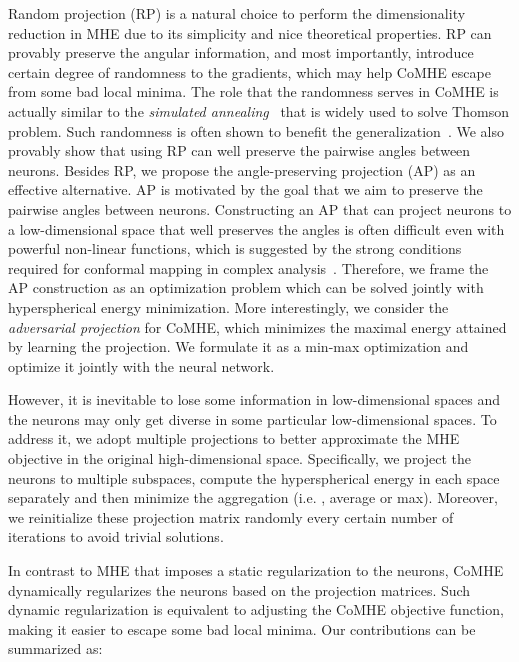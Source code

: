 \par
Random projection (RP) is a natural choice to perform the dimensionality reduction in MHE due to its simplicity and nice theoretical properties. RP can provably preserve the angular information, and most importantly, introduce certain degree of randomness to the gradients, which may help CoMHE escape from some bad local minima. The role that the randomness serves in CoMHE is actually similar to the \emph{simulated annealing}~\cite{xiang1997generalized,xiang2000efficiency} that is widely used to solve Thomson problem. Such randomness is often shown to benefit the generalization~\cite{kawaguchi2018deep,rahimi2008random}. We also provably show that using RP can well preserve the pairwise angles between neurons. Besides RP, we propose the angle-preserving projection (AP) as an effective alternative. AP is motivated by the goal that we aim to preserve the pairwise angles between neurons. Constructing an AP that can project neurons to a low-dimensional space that well preserves the angles is often difficult even with powerful non-linear functions, which is suggested by the strong conditions required for conformal mapping in complex analysis~\cite{nehari2012conformal}. Therefore, we frame the AP construction as an optimization problem which can be solved jointly with hyperspherical energy minimization. More interestingly, we consider the \emph{adversarial projection} for CoMHE, which minimizes the maximal energy attained by learning the projection. We formulate it as a min-max optimization and optimize it jointly with the neural network.
\par
However, it is inevitable to lose some information in low-dimensional spaces and the neurons may only get diverse in some particular low-dimensional spaces. To address it, we adopt multiple projections to better approximate the MHE objective in the original high-dimensional space. Specifically, we project the neurons to multiple subspaces, compute the hyperspherical energy in each space separately and then minimize the aggregation (i.e. , average or max). Moreover, we reinitialize these projection matrix randomly every certain number of iterations to avoid trivial solutions. 

\par
In contrast to MHE that imposes a static regularization to the neurons, CoMHE dynamically regularizes the neurons based on the projection matrices. Such dynamic regularization is equivalent to adjusting the CoMHE objective function, making it easier to escape some bad local minima. Our contributions can be summarized as:
\par

